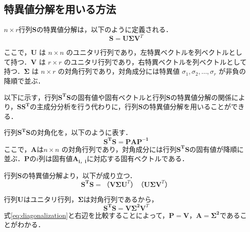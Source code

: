 \documentclass[a4j,12pt]{jreport}
\begin{document}
\subsection{特異値分解を用いる方法}
$n \times r$行列$\mathbf{S}$の特異値分解は，以下のように定義される．
\[
\mathbf{S} = \mathbf{U} \mathbf{\Sigma} \mathbf{V}^T
\]

ここで，\( \mathbf{U} \) は \( n \times n \) のユニタリ行列であり，左特異ベクトルを列ベクトルとして持つ．\( \mathbf{V} \) は \( r \times r \) のユニタリ行列であり，右特異ベクトルを列ベクトルとして持つ．\(\mathbf{ \Sigma }\) は \( n \times r \) の対角行列であり，対角成分には特異値 \( \sigma_1, \sigma_2, \dots, \sigma_r \) が非負の降順で並ぶ．

以下に示す，行列$\mathbf{S^T}\mathbf{S}$の固有値や固有ベクトルと行列$\mathbf{S}$の特異値分解の関係により，$\mathbf{S}\mathbf{S^T}$の主成分分析を行う代わりに，行列\(\mathbf{S}\)の特異値分解を用いることができる．

行列$\mathbf{S^T}\mathbf{S}$の対角化を，以下のように表す．
\begin{equation}\label{eq:diagonalization}
	\mathbf{S^T}\mathbf{S} = \mathbf{P}\mathbf{A}\mathbf{P^{-1}}
\end{equation}
ここで，\(\mathbf{A}\)は\( n \times n \) の対角行列であり，対角成分には行列$\mathbf{S^T}\mathbf{S}$の固有値が降順に並ぶ．\(\mathbf{P}\)の\(i\)列は固有値\(\mathbf{A_{i，i}}\)に対応する固有ベクトルである．

行列\(\mathbf{S}\)の特異値分解より，以下が成り立つ．
\[
\mathbf{S^T}\mathbf{S} = （\mathbf{V} \mathbf{\Sigma} \mathbf{U}^T）（\mathbf{U} \mathbf{\Sigma} \mathbf{V}^T）
\]

行列\(\mathbf{U}\)はユニタリ行列，\(\mathbf{\Sigma}\)は対角行列であるから，
\[
\mathbf{S^T}\mathbf{S} = \mathbf{V}\mathbf{\Sigma^2} \mathbf{V}^T
\]
式\ref{eq:diagonalization}と右辺を比較することによって，\(\mathbf{P} = \mathbf{V} \)，\(\mathbf{A} = \mathbf{\Sigma^2} \)であることがわかる．
\end{document}
